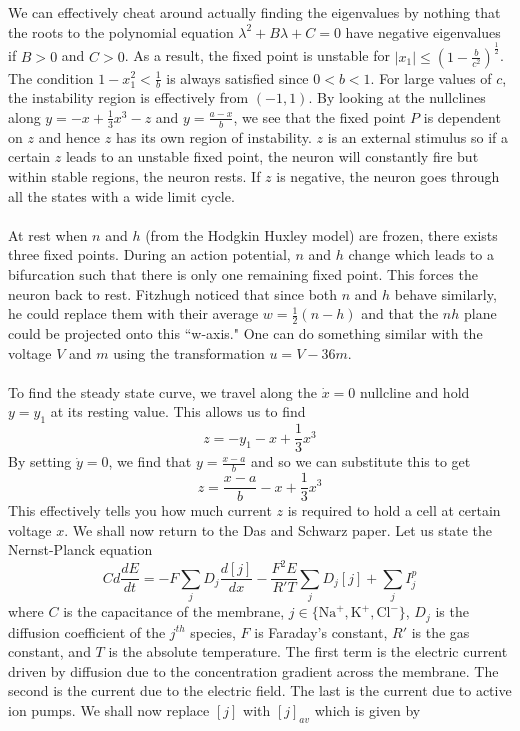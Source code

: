 \documentclass{article}
\newcommand{\od}[2]{\frac{d #1}{d #2}}
\numberwithin{equation}{section}
\begin{document}
We can effectively cheat around actually finding the eigenvalues by nothing that the roots to the polynomial equation $\lambda^2+B\lambda +C=0$ have negative eigenvalues if $B>0$ and $C>0$. As a result, the fixed point is unstable for $|x_1| \leq (1-\frac{b}{c^2})^{\frac{1}{2}}$. The condition $1-x_1^2< \frac{1}{b}$ is always satisfied since $0<b<1$. For large values of $c$, the instability region is effectively from $(-1,1)$. By looking at the nullclines along $y=-x+\tfrac{1}{3}x^3-z$ and $y=\frac{a-x}{b}$, we see that the fixed point $P$ is dependent on $z$ and hence $z$ has its own region of instability. $z$ is an external stimulus so if a certain $z$ leads to an unstable fixed point, the neuron will constantly fire but within stable regions, the neuron rests. If $z$ is negative, the neuron goes through all the states with a wide limit cycle. \\\\
At rest when $n$ and $h$ (from the Hodgkin Huxley model) are frozen, there exists three fixed points. During an action potential, $n$ and $h$ change which leads to a bifurcation such that there is only one remaining fixed point. This forces the neuron back to rest. Fitzhugh noticed that since both $n$ and $h$ behave similarly, he could replace them with their average $w=\tfrac{1}{2}(n-h)$ and that the $nh$ plane could be projected onto this ``w-axis." One can do something similar with the voltage $V$ and $m$ using the transformation $u=V-36m$.\\\\
To find the steady state curve, we travel along the $\dot{x}=0$ nullcline and hold $y=y_1$ at its resting value. This allows us to find 
\begin{equation}
    z=-y_1-x+\frac{1}{3}x^3
\end{equation}
By setting $\dot{y}=0$, we find that $y = \frac{x-a}{b}$ and so we can substitute this to get 
\begin{equation}
    z= \frac{x-a}{b} -x+\frac{1}{3}x^3
\end{equation}
This effectively tells you how much current $z$ is required to hold a cell at certain voltage $x$. We shall now return to the Das and Schwarz paper. Let us state the Nernst-Planck equation
\begin{equation}
    Cd\od{E}{t} = -F\sum_j D_j \od{[j]}{x} - \frac{F^2E}{R'T} \sum_jD_j[j] +\sum_jI^p_j \label{eq:NP}
\end{equation}
where $C$ is the capacitance of the membrane, $j\in \{\text{Na}^+, \text{K}^+, \text{Cl}^-\}$, $D_j$ is the diffusion coefficient of the $j^{th}$ species, $F$ is Faraday's constant, $R'$ is the gas constant, and $T$ is the absolute temperature. The first term is the electric current driven by diffusion due to the concentration gradient across the membrane. The second is the current due to the electric field. The last is the current due to active ion pumps. We shall now replace $[j]$ with $[j]_{av}$ which is given by 
\end{document}
